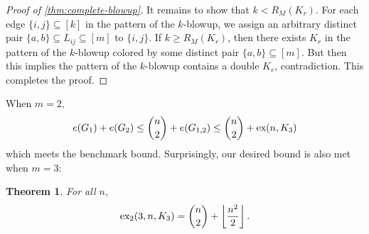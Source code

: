 \documentclass[10pt, reqno]{report}
\newtheorem{theorem}{Theorem}[chapter]
\newcommand*{\ex}{\textnormal{ex}}
\newcommand*{\dex}{\textnormal{ex}_2}
\begin{document}
\begin{proof}[Proof of \cref{thm:complete-blowup}]
  It remains to show that $k < R_M(K_r)$. For each edge $\{i, j\} \subseteq [k]$ in the pattern of the $k$-blowup, we assign an arbitrary distinct pair $\{a, b\} \subseteq L_{ij} \subseteq [m]$ to $\{i, j\}$. If $k \geq R_M(K_r)$, then there exists $K_r$ in the pattern of the $k$-blowup colored by some distinct pair $\{a, b\} \subseteq [m]$. But then this implies the pattern of the $k$-blowup contains a double $K_r$, contradiction. This completes the proof.
\end{proof}





When $m = 2$, 
\[
	e(G_1) + e(G_2) \leq \binom{n}{2} + e(G_{1, 2}) \leq \binom{n}{2} + \ex(n, K_3)
\]
which meets the benchmark bound. Surprisingly, our desired bound is also met when $m = 3$:

\begin{theorem}
  For all $n$,
  \[
    \dex(3, n, K_3) = \binom{n}{2} + \left\lfloor \frac{n^2}{2} \right\rfloor.
  \]
\end{theorem}
\end{document}

